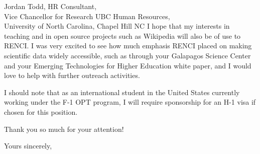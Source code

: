 \documentclass[12pt,letter]{letter}
\begin{document}
\begin{letter}{Jordan Todd, HR Consultant, \\
Vice Chancellor for Research UBC Human Resources, \\
University of North Carolina, 
Chapel Hill NC}
I hope that my interests in teaching and in open source projects such as Wikipedia will also be of use to RENCI. I was very excited to see how much emphasis RENCI placed on making scientific data widely accessible, such as through your Galapagos Science Center and your Emerging Technologies for Higher Education white paper, and I would love to help with further outreach activities.

I should note that as an international student in the United States currently working under the F-1 OPT program, I will require sponsorship for an H-1 visa if chosen for this position.

Thank you so much for your attention!

\closing{Yours sincerely,}

\end{letter}
\end{document}
